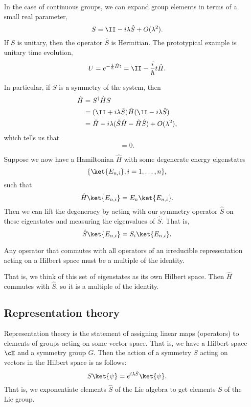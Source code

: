 In the case of continuous groups, we can expand group elements in terms of a small real parameter,
\begin{equation}
    S = \II - i\lambda \hat S + O(\lambda^2).
\end{equation}
If $S$ is unitary, then the operator $\hat S$ is Hermitian. The prototypical example is unitary time evolution,
\begin{equation}
    U=e^{-\frac{i}{\hbar} \hat H t} = \II - \frac{i}{\hbar} t \hat H.
\end{equation}

In particular, if $S$ is a symmetry of the system, then
\begin{align}
    \hat H &= S^\dagger \hat H S\\
        &= (\II + i\lambda \hat S) \hat H (\II - i\lambda \hat S)\\
        &= \hat H - i\lambda(\hat S \hat H - \hat H \hat S) + O(\lambda^2),
\end{align}
which tells us that
\begin{equation}
    [\hat S, \hat H]= 0.
\end{equation}

Suppose we now have a Hamiltonian $\hat H$ with some degenerate energy eigenstates
\begin{equation}
    \set{\ket{E_{n,i}},i=1,\ldots,n},
\end{equation}
such that
\begin{equation}
    \hat H \ket{E_{n,i}} = E_n\ket{E_{n,i}}.
\end{equation}
Then we can lift the degeneracy by acting with our symmetry operator $\hat S$ on these eigenstates and measuring the eigenvalues of $\hat S$. That is,
\begin{equation}
    \hat S \ket{E_{n,i}} = S_i \ket{E_{n,i}}.
\end{equation}

\begin{lem}
    Any operator that commutes with all operators of an irreducible representation acting on a Hilbert space must be a multiple of the identity.
\end{lem}
That is, we think of this set of eigenstates as its own Hilbert space. Then $\hat H$ commutes with $\hat S$, so it is a multiple of the identity.

\subsection*{Representation theory}
Representation theory is the statement of assigning linear maps (operators) to elements of groups acting on some vector space. That is, we have a Hilbert space $\cH$ and a symmetry group $G$. Then the action of a symmetry $S$ acting on vectors in the Hilbert space is as follows:
\begin{equation}
    S\ket{\psi} = e^{i\lambda \hat S}\ket{\psi}.
\end{equation}
That is, we exponentiate elements $\hat S$ of the Lie algebra to get elements $S$ of the Lie group.

